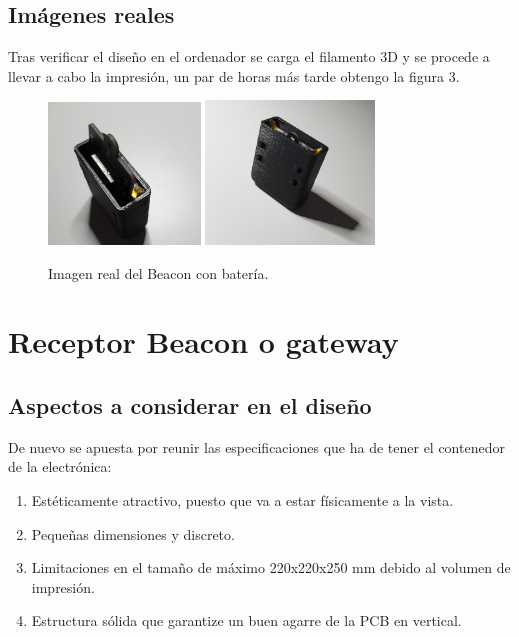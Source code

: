 \documentclass[paper=a4, fontsize=11pt,twoside]{scrartcl}
\begin{document}
    \subsection{Imágenes reales}
        Tras verificar el diseño en el ordenador se carga el filamento 3D y se procede a llevar a cabo la impresión, un par de horas más tarde
        obtengo la figura 3.
        \begin{center}
            \begin{figure}[ht]
                \centering
                \includegraphics[width=0.36\textwidth]{../3d_beacon_1.jpeg}
                \includegraphics[width=0.4\textwidth]{../3d_beacon_2.jpeg}
                \caption{Imagen real del Beacon con batería.}
                \label{fig:mesh1}
            \end{figure}
        \end{center}

\section{Receptor Beacon o gateway}
    \subsection{Aspectos a considerar en el diseño}
        De nuevo se apuesta por reunir las especificaciones que ha de tener el contenedor de la electrónica:
        \begin{enumerate}
            \item Estéticamente atractivo, puesto que va a estar físicamente a la vista.
            \item Pequeñas dimensiones y discreto.
            \item Limitaciones en el tamaño de máximo 220x220x250 mm debido al volumen de impresión.
            \item Estructura sólida que garantize un buen agarre de la PCB en vertical.
        \end{enumerate}
\end{document}
